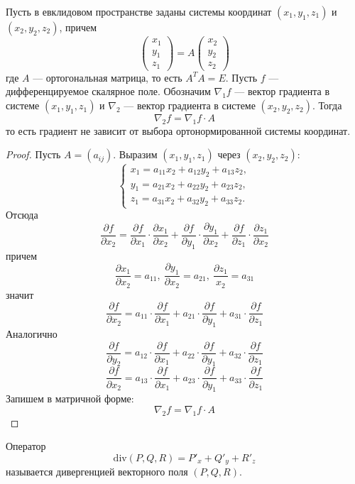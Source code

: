 \begin{statement}
    Пусть в евклидовом пространстве заданы системы координат $(x_1,y_1,z_1)$ и $(x_2,y_2,z_2)$, причем
    \[\begin{pmatrix}
        x_1\\
        y_1\\
        z_1
    \end{pmatrix}=A \begin{pmatrix}
        x_2\\
        y_2\\
        z_2
    \end{pmatrix}\]
    где $A$ --- ортогональная матрица, то есть $A^T A=E$. Пусть $f$ --- дифференцируемое скалярное поле. Обозначим $\nabla_1 f$ --- вектор градиента в системе $(x_1,y_1,z_1)$ и $\nabla_2$ --- вектор градиента в системе $(x_2,y_2,z_2)$. Тогда
    \[\nabla_2 f=\nabla_1 f\cdot A\]
    то есть градиент не зависит от выбора ортонормированной системы координат.
\end{statement}
\begin{proof}
    Пусть $A=(a_{ij})$. Выразим $(x_1,y_1,z_1)$ через $(x_2,y_2,z_2)$:
    \[\begin{cases}
        x_1=a_{11}x_2+a_{12}y_2+a_{13}z_2,\\
        y_1=a_{21}x_2+a_{22}y_2+a_{23}z_2,\\
        z_1=a_{31}x_2+a_{32}y_2+a_{33}z_2.
    \end{cases}\]
    Отсюда
    \[\frac{\partial f}{\partial x_2}=\frac{\partial f}{\partial x_1}\cdot \frac{\partial x_1}{\partial x_2}+\frac{\partial f}{\partial y_1}\cdot \frac{\partial y_1}{\partial x_2}+\frac{\partial f}{\partial z_1}\cdot \frac{\partial z_1}{\partial x_2}\]
    причем 
    \[\frac{\partial x_1}{\partial x_2}=a_{11},\ \frac{\partial y_1}{\partial x_2}=a_{21},\ \frac{\partial z_1}{x_2}=a_{31}\]
    значит
    \[\frac{\partial f}{\partial x_2}=a_{11}\cdot \frac{\partial f}{\partial x_1}+a_{21}\cdot \frac{\partial f}{\partial y_1}+a_{31}\cdot \frac{\partial f}{\partial z_1}\]
    Аналогично
    \[\frac{\partial f}{\partial y_2}=a_{12}\cdot \frac{\partial f}{\partial x_1}+a_{22}\cdot \frac{\partial f}{\partial y_1}+a_{32}\cdot \frac{\partial f}{\partial z_1}\] 
    \[\frac{\partial f}{\partial x_2}=a_{13}\cdot \frac{\partial f}{\partial x_1}+a_{23}\cdot \frac{\partial f}{\partial y_1}+a_{33}\cdot \frac{\partial f}{\partial z_1}\]
    Запишем в матричной форме:
    \[\nabla_2 f=\nabla_1 f\cdot A\]
\end{proof}
\begin{definition}
    Оператор
    \[\text{div}(P,Q,R)=P'_x+Q'_y+R'_z\]
    называется дивергенцией векторного поля $(P,Q,R)$.
\end{definition}
